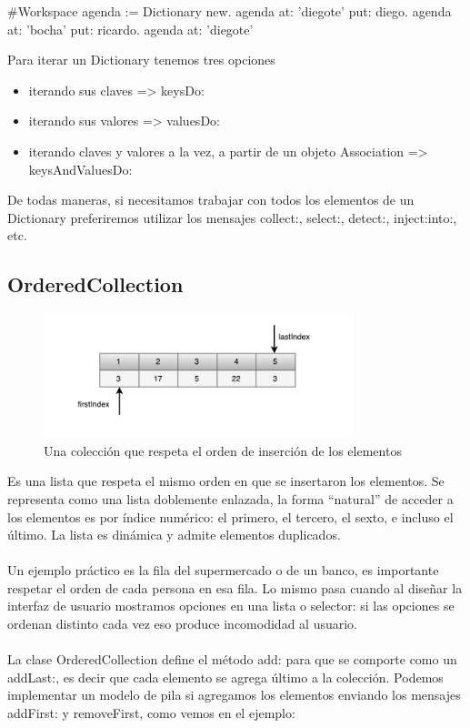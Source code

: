 \documentclass[a4paper,12pt]{book}
\begin{document}
\begin{code}
#Workspace
agenda := Dictionary new.
agenda at: 'diegote' put: diego.
agenda at: 'bocha' put: ricardo.
agenda at: 'diegote'
\end{code}

Para iterar un Dictionary tenemos tres opciones

\begin{itemize}
 \item iterando sus claves => keysDo:
 \item iterando sus valores => valuesDo:
 \item iterando claves y valores a la vez, a partir de un objeto Association => \newline 
 keysAndValuesDo:
\end{itemize}

De todas maneras, si necesitamos trabajar con todos los elementos de un Dictionary preferiremos utilizar
los mensajes collect:, select:, detect:, inject:into:, etc.

\subsection{OrderedCollection}

\begin{figure}[h!]
    \centering
    \includegraphics[width=0.8\textwidth]{images/40_OrderedCollection.pdf}
    \caption{Una colección que respeta el orden de inserción de los elementos}
\end{figure}
\FloatBarrier

Es una lista que respeta el mismo orden en que se insertaron los elementos. Se representa como una lista
doblemente enlazada, la forma ``natural'' de acceder a los elementos es por índice numérico: el primero, 
el tercero, el sexto, e incluso el último. La lista es dinámica y admite elementos duplicados. 
\\
\\
Un ejemplo práctico es la fila del supermercado o de un banco, es importante respetar el orden de cada
persona en esa fila. Lo mismo pasa cuando al diseñar la interfaz de usuario mostramos opciones en una
lista o selector: si las opciones se ordenan distinto cada vez eso produce incomodidad al usuario.
\\
\\
La clase OrderedCollection define el método add: para que se comporte como un addLast:, es decir que cada
elemento se agrega último a la colección. Podemos implementar un modelo de pila si agregamos los elementos
enviando los mensajes addFirst: y removeFirst, como vemos en el ejemplo:
\end{document}
